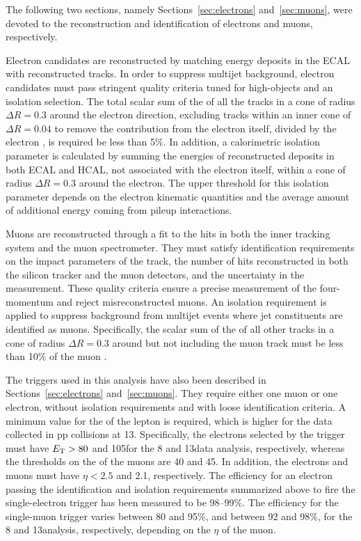 The following two sections, namely Sections~\ref{sec:electrons} and~\ref{sec:muons}, were devoted to the reconstruction and identification of electrons and muons, respectively.

Electron candidates are reconstructed by matching energy deposits in the ECAL with reconstructed tracks. In order to suppress multijet background, electron candidates must pass stringent quality criteria tuned for high-\pt objects and an isolation selection. The total scalar sum of the \pt of all the tracks in a cone of radius $\Delta R = 0.3$ around the electron direction, excluding tracks within an inner cone of $\Delta R = 0.04$ to remove the contribution from the electron itself, divided by the electron \pt, is required be less than 5\%. In addition, a calorimetric isolation parameter is calculated by summing the energies of reconstructed deposits in both ECAL and HCAL, not associated with the electron itself, within a cone of radius $\Delta R = 0.3$ around the electron. The upper threshold for this isolation parameter depends on the electron kinematic quantities and the average amount of additional energy coming from pileup interactions.

Muons are reconstructed through a fit to the hits in both the inner tracking system and the muon spectrometer.
They must satisfy identification requirements on the impact parameters of the track, the number of hits reconstructed in both the silicon tracker and the muon detectors, and the uncertainty in the \pt measurement.
These quality criteria ensure a precise measurement of the four-momentum and reject misreconstructed muons.
An isolation requirement is applied to suppress background from multijet events where jet constituents are identified as muons.
Specifically, the scalar sum of the \pt of all other tracks in a cone of radius $\Delta R = 0.3$ around but not including the muon track must be less than 10\% of the muon \pt.

The triggers used in this analysis have also been described in Sections~\ref{sec:electrons} and~\ref{sec:muons}. They require either one muon or one electron, without isolation requirements and with loose identification criteria.
A minimum value for the \pt of the lepton is required, which is higher for the data collected in pp collisions at 13\TeV.
Specifically, the electrons selected by the trigger must have $E_{\mathrm{T}} > 80$ and 105\GeV for the 8 and 13\TeV data analysis, respectively,
whereas the thresholds on the \pt of the muons are 40 and 45\GeV. In addition, the electrons and muons must have $\eta < 2.5$ and 2.1, respectively.
The efficiency for an electron passing the identification and isolation requirements summarized above to fire the single-electron trigger has been measured to be 98--99\%.
The efficiency for the single-muon trigger varies between 80 and 95\%, and between 92 and 98\%, for the 8 and 13\TeV analysis, respectively, depending on the $\eta$ of the muon.\\

